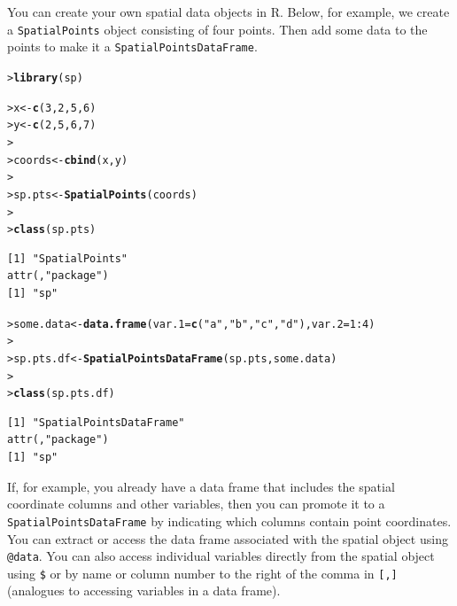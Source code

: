 \documentclass[12pt,oneside]{book}\usepackage[]{graphicx}\usepackage[]{color}
\makeatletter
\newcommand{\hlnum}[1]{\textcolor[rgb]{0.686,0.059,0.569}{#1}}%
\newcommand{\hlstr}[1]{\textcolor[rgb]{0.192,0.494,0.8}{#1}}%
\newcommand{\hlopt}[1]{\textcolor[rgb]{0,0,0}{#1}}%
\newcommand{\hlstd}[1]{\textcolor[rgb]{0.345,0.345,0.345}{#1}}%
\newcommand{\hlkwb}[1]{\textcolor[rgb]{0.69,0.353,0.396}{#1}}%
\newcommand{\hlkwc}[1]{\textcolor[rgb]{0.333,0.667,0.333}{#1}}%
\newcommand{\hlkwd}[1]{\textcolor[rgb]{0.737,0.353,0.396}{\textbf{#1}}}%
\newenvironment{kframe}{%
 \def\at@end@of@kframe{}%
 \ifinner\ifhmode%
  \def\at@end@of@kframe{\end{minipage}}%
  \begin{minipage}{\columnwidth}%
 \fi\fi%
 \def\FrameCommand##1{\hskip\@totalleftmargin \hskip-\fboxsep
 \colorbox{shadecolor}{##1}\hskip-\fboxsep
     \hskip-\linewidth \hskip-\@totalleftmargin \hskip\columnwidth}%
 \MakeFramed {\advance\hsize-\width
   \@totalleftmargin\z@ \linewidth\hsize
   \@setminipage}}%
 {\par\unskip\endMakeFramed%
 \at@end@of@kframe}
\newenvironment{knitrout}{}{} %
\makeatother
\begin{document}
You can create your own spatial data objects in R. Below, for example, we create a \verb+SpatialPoints+ object consisting of four points. Then add some data to the points to make it a \verb+SpatialPointsDataFrame+.
\begin{knitrout}
\color{fgcolor}\begin{kframe}
\begin{alltt}
\hlstd{> }\hlkwd{library}\hlstd{(sp)}
\end{alltt}


{\ttfamily\noindent\itshape\color{messagecolor}{Loading required package: methods}}\begin{alltt}
\hlstd{> }\hlstd{x} \hlkwb{<-} \hlkwd{c}\hlstd{(}\hlnum{3}\hlstd{,} \hlnum{2}\hlstd{,} \hlnum{5}\hlstd{,} \hlnum{6}\hlstd{)}
\hlstd{> }\hlstd{y} \hlkwb{<-} \hlkwd{c}\hlstd{(}\hlnum{2}\hlstd{,} \hlnum{5}\hlstd{,} \hlnum{6}\hlstd{,} \hlnum{7}\hlstd{)}
\hlstd{> }
\hlstd{> }\hlstd{coords} \hlkwb{<-} \hlkwd{cbind}\hlstd{(x, y)}
\hlstd{> }
\hlstd{> }\hlstd{sp.pts} \hlkwb{<-} \hlkwd{SpatialPoints}\hlstd{(coords)}
\hlstd{> }
\hlstd{> }\hlkwd{class}\hlstd{(sp.pts)}
\end{alltt}
\begin{verbatim}
[1] "SpatialPoints"
attr(,"package")
[1] "sp"
\end{verbatim}
\begin{alltt}
\hlstd{> }\hlstd{some.data} \hlkwb{<-} \hlkwd{data.frame}\hlstd{(}\hlkwc{var.1} \hlstd{=} \hlkwd{c}\hlstd{(}\hlstr{"a"}\hlstd{,} \hlstr{"b"}\hlstd{,} \hlstr{"c"}\hlstd{,} \hlstr{"d"}\hlstd{),} \hlkwc{var.2} \hlstd{=} \hlnum{1}\hlopt{:}\hlnum{4}\hlstd{)}
\hlstd{> }
\hlstd{> }\hlstd{sp.pts.df} \hlkwb{<-} \hlkwd{SpatialPointsDataFrame}\hlstd{(sp.pts, some.data)}
\hlstd{> }
\hlstd{> }\hlkwd{class}\hlstd{(sp.pts.df)}
\end{alltt}
\begin{verbatim}
[1] "SpatialPointsDataFrame"
attr(,"package")
[1] "sp"
\end{verbatim}
\end{kframe}
\end{knitrout}

If, for example, you already have a data frame that includes the spatial coordinate columns and other variables, then you can promote it to a \verb+SpatialPointsDataFrame+ by indicating which columns contain point coordinates. You can extract or access the data frame associated with the spatial object using \verb+@data+. You can also access individual variables directly from the spatial object using \verb+$+ or by name or column number to the right of the comma in \verb+[,]+ (analogues to accessing variables in a data frame).
\end{document}
